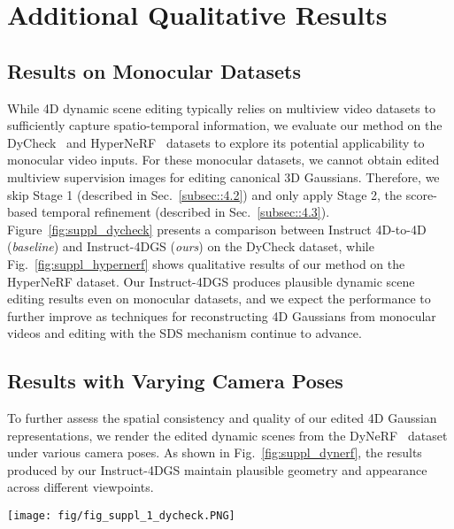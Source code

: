 \clearpage
\setcounter{page}{1}
\maketitlesupplementary


\section{Additional Qualitative Results}

\subsection{Results on Monocular Datasets}
While 4D dynamic scene editing typically relies on multiview video datasets to sufficiently capture spatio-temporal information, we evaluate our method on the DyCheck~\cite{ref_72_dycheck} and HyperNeRF~\cite{ref_73_hypernerf} datasets to explore its potential applicability to monocular video inputs. For these monocular datasets, we cannot obtain edited multiview supervision images for editing canonical 3D Gaussians. Therefore, we skip Stage 1 (described in Sec.~\ref{subsec::4.2}) and only apply Stage 2, the score-based temporal refinement (described in Sec.~\ref{subsec::4.3}). Figure~\ref{fig:suppl_dycheck} presents a comparison between Instruct 4D-to-4D (\emph{baseline}) and Instruct-4DGS (\emph{ours}) on the DyCheck dataset, while Fig.~\ref{fig:suppl_hypernerf} shows qualitative results of our method on the HyperNeRF dataset. Our Instruct-4DGS produces plausible dynamic scene editing results even on monocular datasets, and we expect the performance to further improve as techniques for reconstructing 4D Gaussians from monocular videos and editing with the SDS mechanism continue to advance.


\subsection{Results with Varying Camera Poses}
To further assess the spatial consistency and quality of our edited 4D Gaussian representations, we render the edited dynamic scenes from the DyNeRF~\cite{ref_37_neural3dvideo} dataset under various camera poses. As shown in Fig.~\ref{fig:suppl_dynerf}, the results produced by our Instruct-4DGS maintain plausible geometry and appearance across different viewpoints.


\begin{figure*}[!t]
\centering
    \texttt{[image: fig/fig\_suppl\_1\_dycheck.PNG]}
    \caption{\textbf{Qualitative comparison of visual quality on the DyCheck~\cite{ref_72_dycheck} dataset (a \emph{monocular} dataset)}: We compare our method, Instruct-4DGS (\emph{ours}), with the baseline, Instruct 4D-to-4D~\cite{ref_9_i4d24d} (\emph{baseline}), on the \emph{mochi-high-five} scene from the DyCheck dataset.}
    \label{fig:suppl_dycheck}
\end{figure*}


